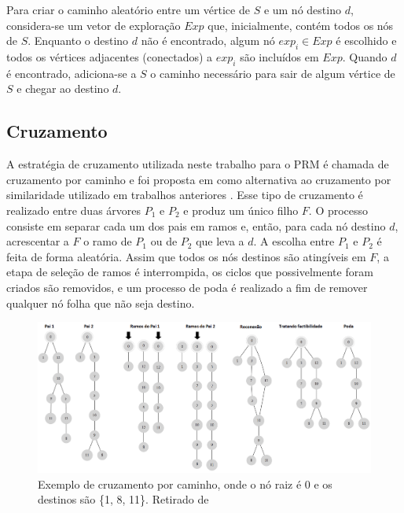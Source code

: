 Para criar o caminho aleatório entre um vértice de $S$ e um nó destino $d$, considera-se um vetor de exploração $Exp$ que, inicialmente, contém todos os nós de $S$. Enquanto o destino $d$ não é encontrado, algum nó $exp_i \in Exp$ é escolhido e todos os vértices adjacentes (conectados) a $exp_i$ são incluídos em $Exp$. Quando $d$ é encontrado, adiciona-se a $S$ o caminho necessário para sair de algum vértice de $S$ e chegar ao destino $d$.

\subsection{Cruzamento}

A estratégia de cruzamento utilizada neste trabalho para o PRM é chamada de cruzamento por caminho e foi proposta em \cite{Lafeta2016} como alternativa ao cruzamento por similaridade utilizado em trabalhos anteriores \cite{Bueno2010}. Esse tipo de cruzamento é realizado entre duas árvores $P_1$ e $P_2$ e produz um único filho $F$. O processo consiste em separar cada um dos pais em ramos e, então, para cada nó destino $d$, acrescentar a $F$ o ramo de $P_1$ ou de $P_2$ que leva a $d$. A escolha entre $P_1$ e $P_2$ é feita de forma aleatória. Assim que todos os nós destinos são atingíveis em $F$, a etapa de seleção de ramos é interrompida, os ciclos que possivelmente foram criados são removidos, e um processo de poda é realizado a fim de remover qualquer nó folha que não seja destino.

\begin{figure}[!htbp]
	\label{fig_prm-cruzamento-caminho}
	\centering
	\includegraphics[width=1\textwidth]{cap_problemas/figs/prm-cruzamento-caminho}
	\caption{Exemplo de cruzamento por caminho, onde o nó raiz é 0 e os destinos são \{1, 8, 11\}. Retirado de \cite{LafetaThesis}}
\end{figure}

